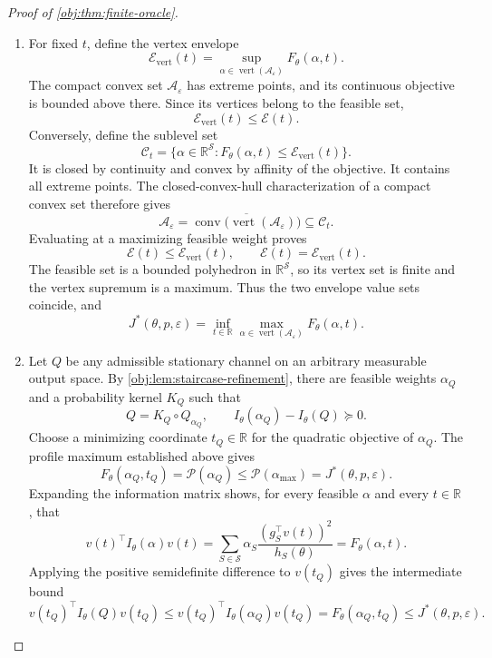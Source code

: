\documentclass[11pt]{article}
\begin{document}
\begin{proof}[Proof of \cref{obj:thm:finite-oracle}]
\begin{enumerate}
\item For fixed \(t\), define the vertex envelope
\[
\mathscr E_{\mathrm{vert}}(t)
=
\sup_{\alpha\in\operatorname{vert}(\mathcal A_\varepsilon)}
F_\theta(\alpha,t).
\]
The compact convex set \(\mathcal A_\varepsilon\) has extreme
points, and its continuous objective is bounded above there.
Since its vertices belong to the feasible set,
\[
\mathscr E_{\mathrm{vert}}(t)\le\mathscr E(t).
\]
Conversely, define the sublevel set
\[
\mathcal C_t=
\{\alpha\in\mathbb R^{\mathcal S}:
F_\theta(\alpha,t)\le\mathscr E_{\mathrm{vert}}(t)\}.
\]
It is closed by continuity and convex by affinity of the objective.
It contains all extreme points. The closed-convex-hull
characterization of a compact convex set therefore gives
\[
\mathcal A_\varepsilon
=
\overline{\operatorname{conv}
\bigl(\operatorname{vert}(\mathcal A_\varepsilon)\bigr)}
\subseteq\mathcal C_t.
\]
Evaluating at a maximizing feasible weight proves
\[
\mathscr E(t)\le\mathscr E_{\mathrm{vert}}(t),
\qquad
\mathscr E(t)=\mathscr E_{\mathrm{vert}}(t).
\]
The feasible set is a bounded polyhedron in
\(\mathbb R^{\mathcal S}\), so its vertex set is finite and the
vertex supremum is a maximum. Thus the two envelope value sets
coincide, and
\[
J^*(\theta,p,\varepsilon)
=
\inf_{t\in\mathbb R}
\max_{\alpha\in\operatorname{vert}(\mathcal A_\varepsilon)}
F_\theta(\alpha,t).
\]

\item Let \(Q\) be any admissible stationary channel on an arbitrary
measurable output space. By \cref{obj:lem:staircase-refinement},
there are feasible weights \(\alpha_Q\) and a probability kernel
\(K_Q\) such that
\[
Q=K_Q\circ Q_{\alpha_Q},
\qquad
I_\theta(\alpha_Q)-I_\theta(Q)\succeq0.
\]
Choose a minimizing coordinate \(t_Q\in\mathbb R\) for the
quadratic objective of \(\alpha_Q\). The profile maximum established
above gives
\[
F_\theta(\alpha_Q,t_Q)
=\mathscr P(\alpha_Q)
\le\mathscr P(\alpha_{\max})
=J^*(\theta,p,\varepsilon).
\]
Expanding the information matrix shows, for every feasible
\(\alpha\) and every \(t\in\mathbb R\), that
\[
v(t)^\top I_\theta(\alpha)v(t)
=
\sum_{S\in\mathcal S}
\alpha_S\frac{(g_S^\top v(t))^2}{h_S(\theta)}
=F_\theta(\alpha,t).
\]
Applying the positive semidefinite difference to \(v(t_Q)\) gives
the intermediate bound
\[
v(t_Q)^\top I_\theta(Q)v(t_Q)
\le
v(t_Q)^\top I_\theta(\alpha_Q)v(t_Q)
=
F_\theta(\alpha_Q,t_Q)
\le J^*(\theta,p,\varepsilon).
\]


\end{enumerate}
\end{proof}
\end{document}

